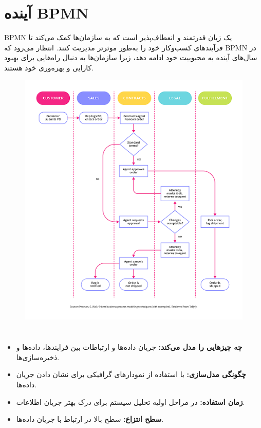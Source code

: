 \section{آینده BPMN}

BPMN یک زبان قدرتمند و انعطاف‌پذیر است که به سازمان‌ها کمک می‌کند تا فرآیندهای کسب‌وکار خود را به‌طور موثرتر مدیریت کنند. انتظار می‌رود که BPMN در سال‌های آینده به محبوبیت خود ادامه دهد، زیرا سازمان‌ها به دنبال راه‌هایی برای بهبود کارایی و بهره‌وری خود هستند.


\begin{figure}[H]
	\centering
	\includegraphics{pic5.png}
	\label{fig:label4}
\end{figure}

\section*{}
\begin{itemize}
	\item \textbf{چه چیزهایی را مدل می‌کند:} جریان داده‌ها و ارتباطات بین فرایندها، داده‌ها و ذخیره‌سازی‌ها.
	\item \textbf{چگونگی مدل‌سازی:} با استفاده از نمودارهای گرافیکی برای نشان دادن جریان داده‌ها.
	\item \textbf{زمان استفاده:} در مراحل اولیه تحلیل سیستم برای درک بهتر جریان اطلاعات.
	\item \textbf{سطح انتزاع:} سطح بالا در ارتباط با جریان داده‌ها.
\end{itemize}

